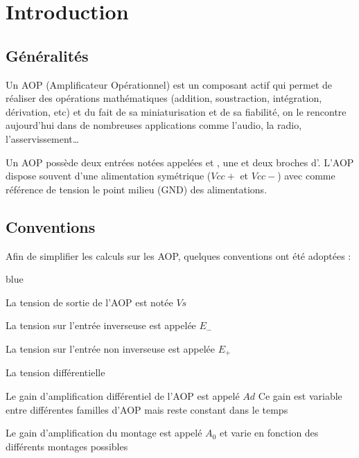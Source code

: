 
 \chapter{Introduction}
 
\section{Généralités}


Un AOP (Amplificateur Opérationnel) est un composant actif qui permet de réaliser des opérations mathématiques (addition, soustraction, intégration, dérivation, etc) et du fait de sa miniaturisation et de sa fiabilité, on le rencontre aujourd’hui dans de nombreuses applications comme l’audio, la radio, l’asservissement…


Un AOP possède deux entrées notées appelées  et , une 
 et deux broches d’.
L’AOP dispose souvent d’une alimentation symétrique ($Vcc+$ et $Vcc-$) avec comme référence de tension le point milieu 
(GND) des alimentations.




\section{Conventions}


Afin de simplifier les calculs sur les AOP, quelques conventions ont été adoptées :

\begin{items}{blue}{\Triangle}
  \item La tension de sortie de l’AOP est notée $Vs$
  \item La tension sur l’entrée inverseuse est appelée $E_-$
  \item La tension sur l’entrée non inverseuse est appelée $E_+$
  \item La tension différentielle 
  \item Le gain d’amplification différentiel de l’AOP est appelé $Ad$
  Ce gain est variable entre différentes familles d’AOP mais reste constant dans le temps
  \item Le gain d’amplification du montage est appelé $A_0$ et varie en fonction des différents montages possibles 
\end{items}

